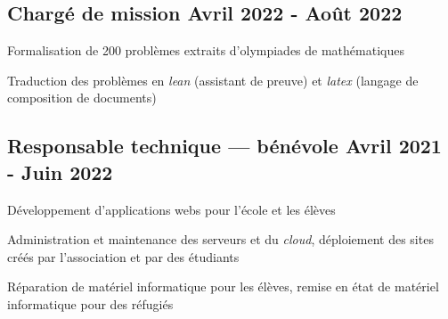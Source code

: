 \subsection{{Chargé de mission \hfill Avril 2022 - Août 2022}}
\begin{zitemize}
    \item Formalisation de 200 problèmes extraits d'olympiades de mathématiques
    \item Traduction des problèmes en \textit{lean} (assistant de preuve) et \textit{latex} (langage de composition de documents)
\end{zitemize}
\vspace{0.1cm}

\subsection{{Responsable technique --- bénévole \hfill Avril 2021 - Juin 2022}}
\begin{zitemize}
    \item Développement d'applications webs pour l'école et les élèves
    \item Administration et maintenance des serveurs et du \textit{cloud}, déploiement des sites créés par l'association et par des étudiants
    \item Réparation de matériel informatique pour les élèves, remise en état de matériel informatique pour des réfugiés
\end{zitemize}
\vspace{0.1cm}
